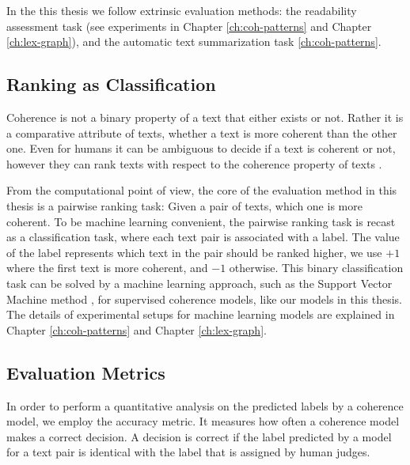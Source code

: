 In the this thesis we follow extrinsic evaluation methods: the readability assessment task (see experiments in Chapter \ref{ch:coh-patterns} and Chapter \ref{ch:lex-graph}), and the automatic text summarization task \ref{ch:coh-patterns}. 

\subsection{Ranking as Classification} 

Coherence is not a binary property of a text that either exists or not. 
Rather it is a comparative attribute of texts, whether a text is more coherent than the other one. 
Even for humans it can be ambiguous to decide if a text is coherent or not, however they can rank texts with respect to the coherence property of texts \cite{halliday76}.   

From the computational point of view, the core of the evaluation method in this thesis is a pairwise ranking task: Given a pair of texts, which one is more coherent. 
To be machine learning convenient, the pairwise ranking task is recast as a classification task, where each text pair is associated with a label. 
The value of the label represents which text in the pair should be ranked higher, we use $+1$ where the first text is more coherent, and $-1$ otherwise. 
This binary classification task can be solved by a machine learning approach, such as the Support Vector Machine method \cite{}, for supervised coherence models, like our models in this thesis. 
The details of experimental setups for machine learning models are explained in Chapter \ref{ch:coh-patterns} and Chapter \ref{ch:lex-graph}.  

\subsection{Evaluation Metrics}

In order to perform a quantitative analysis on the predicted labels by a coherence model, we employ the accuracy metric. 
It measures how often a coherence model makes a correct decision. 
A decision is correct if the label predicted by a model for a text pair is identical with the label that is assigned by human judges. 











